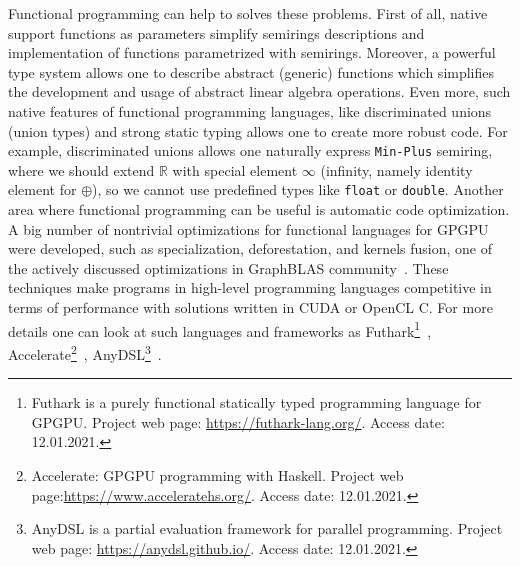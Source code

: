 Functional programming can help to solves these problems.
First of all, native support functions as parameters simplify semirings descriptions and implementation of functions parametrized with semirings. 
Moreover, a powerful type system allows one to describe abstract (generic) functions which simplifies the development and usage of abstract linear algebra operations. 
Even more, such native features of functional programming languages, like discriminated unions (union types) and strong static typing allows one to create more robust code.
For example, discriminated unions allows one naturally express \texttt{Min-Plus} semiring, where we should extend $\mathbb{R}$ with special element $\infty$ (infinity, namely identity element for $\oplus$), so we cannot use predefined types like \texttt{float} or \texttt{double}.
Another area where functional programming can be useful is automatic code optimization.
A big number of nontrivial optimizations for functional languages for GPGPU were developed, such as specialization, deforestation, and kernels fusion, one of the actively discussed optimizations in GraphBLAS community~\cite{10.1145/3466795}.
These techniques make programs in high-level programming languages competitive in terms of performance with solutions written in CUDA or OpenCL C. 
For more details one can look at such languages and frameworks as Futhark\footnote{Futhark is a purely functional statically typed programming language for GPGPU. Project web page: \url{https://futhark-lang.org/}. Access date: 12.01.2021.}~\cite{Henriksen:2017:FPF:3062341.3062354}, Accelerate\footnote{Accelerate: GPGPU programming with Haskell. Project web page:\url{https://www.acceleratehs.org/}. Access date: 12.01.2021.}~\cite{10.1145/2544174.2500595}, AnyDSL\footnote{AnyDSL is a partial evaluation framework for parallel programming. Project web page: \url{https://anydsl.github.io/}. Access date: 12.01.2021.}~\cite{10.1145/3276489}.

